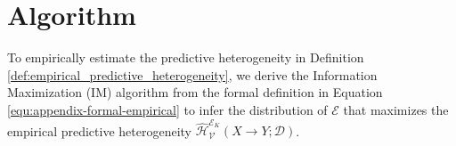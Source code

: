 \section{Algorithm}

To empirically estimate the predictive heterogeneity in Definition \ref{def:empirical_predictive_heterogeneity}, we derive the Information Maximization (IM) algorithm from the formal definition in Equation \ref{equ:appendix-formal-empirical} to infer the distribution of $\mathcal{E}$ that maximizes the empirical predictive heterogeneity $\hat{\mathcal{H}}^{\mathscr{E}_K}_{\mathcal V}(X\rightarrow Y; \mathcal D)$.




